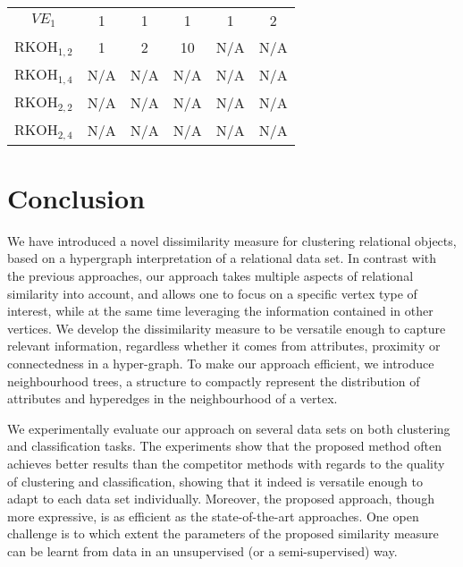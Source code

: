 \begin{table}
\begin{center}
\begin{tabular}[htb]{@{}cccccc@{}}
		$VE_1$			&	1		&	1	   &  	1	  &		1	   &   	2		\\

		RKOH$_{1,2}$	&	1		&	2	   &  	10	  &	N/A		   &   N/A			\\

		RKOH$_{1,4}$	&	N/A		&	N/A	   &  N/A 	  &  N/A	   &  N/A 		\\

		RKOH$_{2,2}$	&	N/A		&	N/A	   &  N/A 	  &  N/A	   &  N/A 		\\

		RKOH$_{2,4}$	&	N/A		&	N/A	   &  N/A 	  &  N/A	   &  N/A 		\\
		\bottomrule
		\end{tabular}

	\end{center}

\end{table}



\section{Conclusion}

We have introduced a novel dissimilarity measure for clustering relational objects, based on a hypergraph interpretation of a relational data set.
In contrast with the previous approaches, our approach takes multiple aspects of relational similarity into account, and  allows one to focus on a specific vertex type of interest, while at the same time leveraging the information contained in other vertices.
We develop the dissimilarity measure to be versatile enough to capture relevant information, regardless whether it comes from attributes, proximity or connectedness in a hyper-graph.
To make our approach efficient, we introduce neighbourhood trees, a structure to compactly represent the distribution of attributes and hyperedges in the neighbourhood of a vertex.


We experimentally evaluate our approach on several data sets on both clustering and classification tasks.
The experiments show that the proposed method often achieves better results than the competitor methods with regards to the quality of clustering and classification, showing that it indeed is versatile enough to adapt to each data set individually.
Moreover, the proposed approach, though more expressive, is as efficient as the state-of-the-art approaches.
One open challenge is to which extent the parameters of the proposed similarity measure can be learnt from data in an unsupervised (or a semi-supervised) way.




